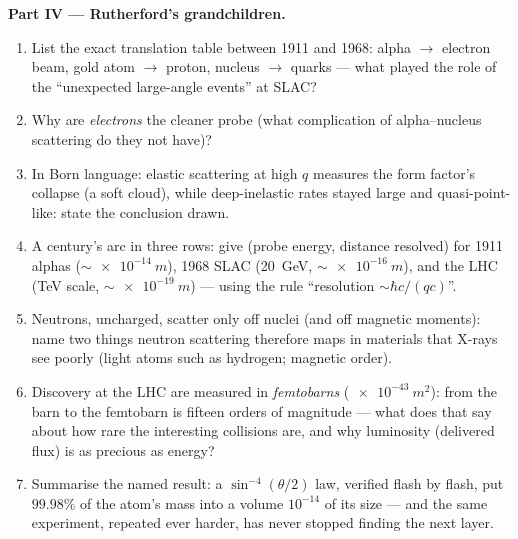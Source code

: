 \begin{problem}
\medskip\noindent\textbf{Part IV --- Rutherford's grandchildren.}
\begin{enumerate}[resume]
  \item List the exact translation table between 1911 and 1968:
        alpha $\to$ electron beam, gold atom $\to$ proton,
        nucleus $\to$ quarks --- what played the role of the
        ``unexpected large-angle events'' at SLAC?
  \item Why are \emph{electrons} the cleaner probe (what
        complication of alpha--nucleus scattering do they not
        have)?
  \item In Born language: elastic scattering at high $q$ measures
        the form factor's collapse (a soft cloud), while
        deep-inelastic rates stayed large and quasi-point-like:
        state the conclusion drawn.
  \item A century's arc in three rows: give (probe energy,
        distance resolved) for 1911 alphas ($\sim\qty{e-14}{m}$),
        1968 SLAC (\qty{20}{GeV}, $\sim\qty{e-16}{m}$), and the
        LHC (TeV scale, $\sim\qty{e-19}{m}$) --- using
        the rule ``resolution $\sim \hbar c/(qc)$''.
  \item Neutrons, uncharged, scatter only off nuclei (and off
        magnetic moments): name two things neutron scattering
        therefore maps in materials that X-rays see poorly
        (light atoms such as hydrogen; magnetic order).
  \item Discovery  at the LHC are measured in
        \emph{femtobarns} ($\qty{e-43}{m^2}$): from the barn to
        the femtobarn is fifteen orders of magnitude --- what does
        that say about how rare the interesting collisions are,
        and why luminosity (delivered flux) is as precious as
        energy?
  \item Summarise the named result: a $\sin^{-4}(\theta/2)$ law,
        verified flash by flash, put $99.98\%$ of the atom's mass
        into a volume $10^{-14}$ of its size --- and the same
        experiment, repeated ever harder, has never stopped
        finding the next layer.
\end{enumerate}
\end{problem}
